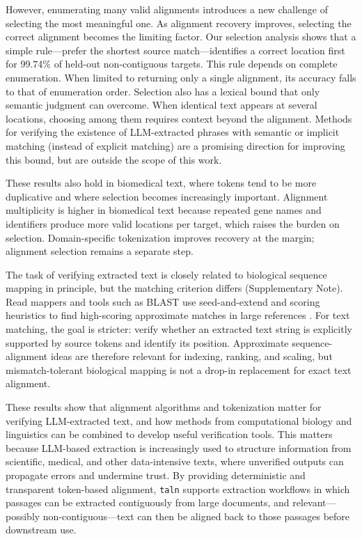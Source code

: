 \documentclass[pdflatex,lineno,referee,sn-vancouver-num]{sn-jnl}
\theoremstyle{thmstyleone}
\theoremstyle{thmstylethree}
\theoremstyle{thmstyletwo}
\begin{document}
However, enumerating many valid alignments introduces a new challenge of selecting the most meaningful one. As alignment recovery improves, selecting the correct alignment becomes the limiting factor. Our selection analysis shows that a simple rule---prefer the shortest source match---identifies a correct location first for 99.74\% of held-out non-contiguous targets. This rule depends on complete enumeration. When limited to returning only a single alignment, its accuracy falls to that of enumeration order. Selection also has a lexical bound that only semantic judgment can overcome. When identical text appears at several locations, choosing among them requires context beyond the alignment. Methods for verifying the existence of LLM-extracted phrases with semantic or implicit matching (instead of explicit matching) are a promising direction for improving this bound, but are outside the scope of this work.

These results also hold in biomedical text, where tokens tend to be more duplicative and where selection becomes increasingly important. Alignment multiplicity is higher in biomedical text because repeated gene names and identifiers produce more valid locations per target, which raises the burden on selection. Domain-specific tokenization improves recovery at the margin; alignment selection remains a separate step.

The task of verifying extracted text is closely related to biological sequence mapping in principle, but the matching criterion differs (Supplementary Note). Read mappers and tools such as BLAST use seed-and-extend and scoring heuristics to find high-scoring approximate matches in large references \citep{Altschul_1990}. For text matching, the goal is stricter: verify whether an extracted text string is explicitly supported by source tokens and identify its position. Approximate sequence-alignment ideas are therefore relevant for indexing, ranking, and scaling, but mismatch-tolerant biological mapping is not a drop-in replacement for exact text alignment.

These results show that alignment algorithms and tokenization matter for verifying LLM-extracted text, and how methods from computational biology and linguistics can be combined to develop useful verification tools. This matters because LLM-based extraction is increasingly used to structure information from scientific, medical, and other data-intensive texts, where unverified outputs can propagate errors and undermine trust. By providing deterministic and transparent token-based alignment, \texttt{taln} supports extraction workflows in which passages can be extracted contiguously from large documents, and relevant---possibly non-contiguous---text can then be aligned back to those passages before downstream use.
\end{document}
